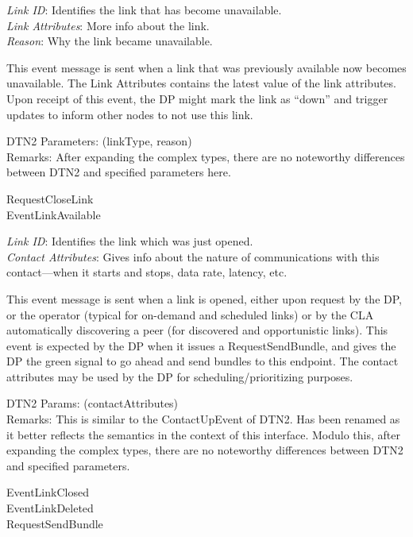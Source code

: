 {
\metP
    {\em Link ID}: Identifies the link that has become unavailable.\\
    {\em Link Attributes}: More info about the link.\\
    {\em Reason}: Why the link became unavailable.

\metD
    This event message is sent when a link that was previously available
    now becomes unavailable. The Link
    Attributes contains the latest value of the link attributes.
    Upon receipt of this event, the DP might mark the link 
    as ``down'' and trigger updates to inform other nodes to not use this
    link.

\metM
    DTN2 Parameters: (linkType, reason)\\
    Remarks: After expanding the complex types, there are no noteworthy
    differences between DTN2 and specified parameters here.

\metR
    RequestCloseLink\\
    EventLinkAvailable
}

{
\metP
    {\em Link ID}: Identifies the link which was just opened.\\
    {\em Contact Attributes}: Gives info about the nature of communications
    with this contact---when it starts and stops, data rate, latency, etc.

\metD
    This event message is sent when a link is opened, either upon request
    by the DP, or the operator (typical for on-demand and scheduled links)
    or by the CLA automatically discovering a peer (for discovered and
    opportunistic links). This event is expected by the DP when it issues
    a RequestSendBundle, and
    gives the DP the green signal to go ahead and send bundles to
    this endpoint. The contact attributes may be used by the DP for
    scheduling/prioritizing purposes.

\metM
    DTN2 Params: (contactAttributes)\\
    Remarks: This is similar to the ContactUpEvent of DTN2. Has been renamed
    as it better reflects the semantics in the context of this interface. 
    Modulo this, after expanding the complex types, there are no noteworthy
    differences between DTN2 and specified parameters.

\metR
    EventLinkClosed\\
    EventLinkDeleted\\
    RequestSendBundle

}

